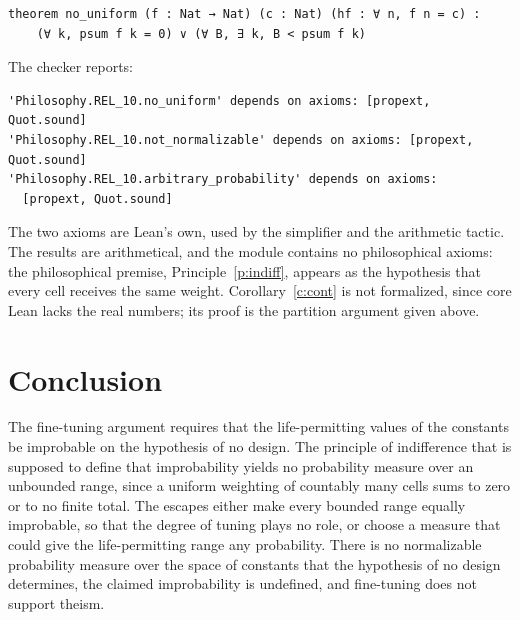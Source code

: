 \documentclass{situationist-preprint}
\begin{document}
\begin{lstlisting}
theorem no_uniform (f : Nat → Nat) (c : Nat) (hf : ∀ n, f n = c) :
    (∀ k, psum f k = 0) ∨ (∀ B, ∃ k, B < psum f k)
\end{lstlisting}

The checker reports:

\begin{lstlisting}
'Philosophy.REL_10.no_uniform' depends on axioms: [propext, Quot.sound]
'Philosophy.REL_10.not_normalizable' depends on axioms: [propext, Quot.sound]
'Philosophy.REL_10.arbitrary_probability' depends on axioms:
  [propext, Quot.sound]
\end{lstlisting}

The two axioms are Lean's own, used by the simplifier and the arithmetic tactic. The results are arithmetical, and the module contains no philosophical axioms: the philosophical premise, Principle~\ref{p:indiff}, appears as the hypothesis that every cell receives the same weight. Corollary~\ref{c:cont} is not formalized, since core Lean lacks the real numbers; its proof is the partition argument given above.

\section{Conclusion}

The fine-tuning argument requires that the life-permitting values of the constants be improbable on the hypothesis of no design. The principle of indifference that is supposed to define that improbability yields no probability measure over an unbounded range, since a uniform weighting of countably many cells sums to zero or to no finite total. The escapes either make every bounded range equally improbable, so that the degree of tuning plays no role, or choose a measure that could give the life-permitting range any probability. There is no normalizable probability measure over the space of constants that the hypothesis of no design determines, the claimed improbability is undefined, and fine-tuning does not support theism.
\end{document}
